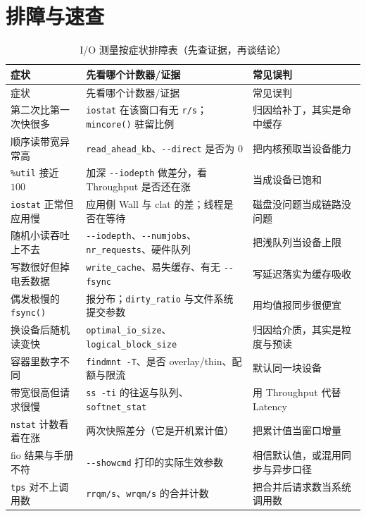 \documentclass[12pt,a4paper,fontset=fandol]{ctexbook}
\newcommand{\Fn}[1]{\texttt{#1()}}
\newcommand{\Tp}[1]{\texttt{#1}}
\newcommand{\Opt}[1]{\texttt{-\/-#1}}
\newcommand{\Bk}{\discretionary{}{}{}}
\newcommand{\Lang}[1]{\textsf{#1}}
\newcommand{\MWall}{\Lang{Wall}}
\newcommand{\MLat}{\Lang{Latency}}
\newcommand{\MThr}{\Lang{Throughput}}
\newcommand{\Mx}[1]{\textsf{#1}}
\begin{document}
\section{排障与速查}
\label{sec:pm08-trouble}

\begin{longtable}{>{\raggedright\arraybackslash}p{} >{\raggedright\arraybackslash}p{} >{\raggedright\arraybackslash}p{}}
\caption{I/O 测量按症状排障表（先查证据，再谈结论）}\label{tab:pm08-io}\\
\toprule
症状 & 先看哪个计数器/证据 & 常见误判 \\
\midrule
\endfirsthead
\toprule
症状 & 先看哪个计数器/证据 & 常见误判 \\
\midrule
\endhead
\bottomrule
\endfoot
第二次比第一次快很多 & \Tp{iostat} 在该窗口有无 \Tp{r/s}；\Fn{mincore} 驻留比例 & 归因给补丁，其实是命中缓存 \\
顺序读带宽异常高 & \Tp{read{\Bk}\_ahead{\Bk}\_kb}、\Opt{direct} 是否为 $0$ & 把内核预取当设备能力 \\
\Tp{\%util} 接近 $100$ & 加深 \Opt{iodepth} 做差分，看 \MThr{} 是否还在涨 & 当成设备已饱和 \\
\Tp{iostat} 正常但应用慢 & 应用侧 \MWall{} 与 \Mx{clat} 的差；线程是否在等待 & 磁盘没问题当成链路没问题 \\
随机小读吞吐上不去 & \Opt{iodepth}、\Opt{numjobs}、\Tp{nr{\Bk}\_requests}、硬件队列 & 把浅队列当设备上限 \\
写数很好但掉电丢数据 & \Tp{write{\Bk}\_cache}、易失缓存、有无 \Opt{fsync} & 写延迟落实为缓存吸收 \\
偶发极慢的 \Fn{fsync} & 报分布；\Tp{dirty{\Bk}\_ratio} 与文件系统提交参数 & 用均值报同步很便宜 \\
换设备后随机读变快 & \Tp{optimal{\Bk}\_io{\Bk}\_size}、\Tp{logical{\Bk}\_block{\Bk}\_size} & 归因给介质，其实是粒度与预读 \\
容器里数字不同 & \Tp{findmnt -T}、是否 overlay/thin、配额与限流 & 默认同一块设备 \\
带宽很高但请求很慢 & \Tp{ss -ti} 的往返与队列、\Tp{softnet{\Bk}\_stat} & 用 \MThr{} 代替 \MLat{} \\
\Tp{nstat} 计数看着在涨 & 两次快照差分（它是开机累计值） & 把累计值当窗口增量 \\
fio 结果与手册不符 & \Opt{showcmd} 打印的实际生效参数 & 相信默认值，或混用同步与异步口径 \\
\Tp{tps} 对不上调用数 & \Tp{rrqm/s}、\Tp{wrqm/s} 的合并计数 & 把合并后请求数当系统调用数 \\
\end{longtable}
\end{document}
